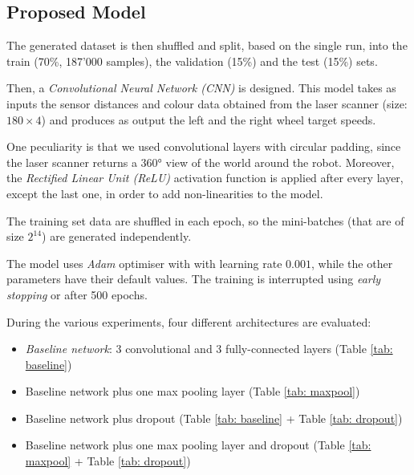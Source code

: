 \subsection{Proposed Model}
The generated dataset is then shuffled and split, based on the single run, into 
the train (70\%, 187'000 samples), the validation (15\%) and the test (15\%) 
sets.

Then, a \emph{Convolutional Neural Network (CNN)} is designed. This model takes 
as inputs the sensor distances and colour data obtained from the laser scanner 
(size: $180 \times 4$) and produces as output the left and the right wheel 
target speeds. 

One peculiarity is that we used convolutional layers with circular padding, 
since the laser scanner returns a 360° view of the world around the robot.
Moreover, the \emph{Rectified Linear Unit (ReLU)} activation function is 
applied after every layer, except the last one, in order to add non-linearities 
to the model. 

The training set data are shuffled in each epoch, so the mini-batches (that are 
of size $2^{14}$) are generated independently. 

The model uses \emph{Adam} optimiser with with learning rate $0.001$, while the 
other parameters have their default values. The training is interrupted using 
\emph{early stopping} or after 500 epochs. 

During the various experiments, four different architectures are evaluated:
\begin{itemize}
	\item \emph{Baseline network}: 3 convolutional and 3 fully-connected
	layers (Table \ref{tab: baseline})
	\item Baseline network plus one max pooling layer (Table \ref{tab: maxpool})
	\item Baseline network plus dropout (Table \ref{tab: baseline} + Table 
	\ref{tab: dropout})
	\item Baseline network plus one max pooling layer and dropout (Table 
	\ref{tab: maxpool} + Table \ref{tab: dropout})
\end{itemize} 


